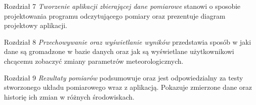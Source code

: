 Rozdział 7 \textit{Tworzenie aplikacji zbierającej dane pomiarowe} stanowi o sposobie projektowania programu odczytującego pomiary oraz prezentuje diagram projektowy aplikacji.


Rozdział 8 \textit{Przechowywanie oraz wyświetlanie wyników} przedstawia sposób w jaki dane są gromadzone w bazie danych oraz jak są wyświetlane użytkownikowi chcącemu zobaczyć zmiany parametrów meteorologicznych.


Rozdział 9 \textit{Rezultaty pomiarów} podsumowuje oraz jest odpowiedzialny za testy stworzonego układu pomiarowego wraz z aplikacją. Pokazuje zmierzone dane oraz historię ich zmian w różnych środowiskach.